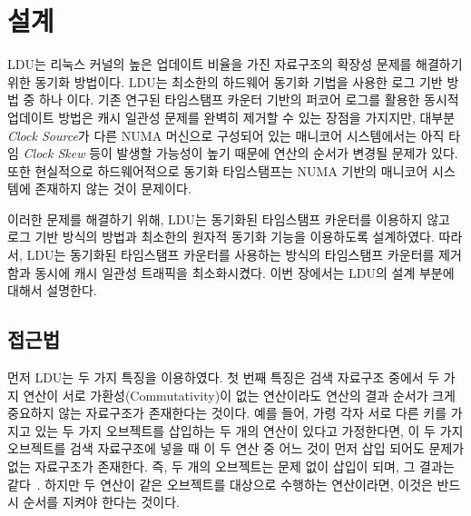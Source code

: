 \section{설계}
\label{sec:ldu}

LDU는 리눅스 커널의 높은 업데이트 비율을 가진 자료구조의 확장성 문제를 해결하기 위한 동기화 방법이다.
LDU는 최소한의 하드웨어 동기화 기법을 사용한 로그 기반 방법 중 하나 이다.
기존 연구된 타임스탬프 카운터 기반의 퍼코어 로그를 활용한 동시적 업데이트 방법은 
캐시 일관성 문제를 완벽히 제거할 수 있는 장점을 가지지만, 
대부분 \textit{Clock Source}가 다른 NUMA 머신으로 구성되어 있는 매니코어 시스템에서는 
아직 타임 \textit{Clock Skew} 등이 발생할 가능성이 높기 때문에 연산의 순서가 변경될 문제가 있다.
또한 현실적으로 하드웨어적으로 동기화 타임스탬프는 NUMA 기반의 매니코어 시스템에 존재하지 않는 것이 문제이다.

이러한 문제를 해결하기 위해, LDU는 동기화된 타임스탬프 카운터를 이용하지 않고 로그 기반 방식의 
방법과 최소한의 원자적 동기화 기능을 이용하도록 설계하였다.
따라서, LDU는 동기화된 타임스탬프 카운터를 사용하는 방식의 타임스탬프 카운터를 
제거함과 동시에 캐시 일관성 트래픽을 최소화시켰다.
이번 장에서는 LDU의 설계 부분에 대해서 설명한다. 

\subsection{접근법}
먼저 LDU는 두 가지 특징을 이용하였다. 
첫 번째 특징은 검색 자료구조 중에서 두 가지 연산이 서로 가환성(Commutativity)이 없는 연산이라도 
연산의 결과 순서가 크게 중요하지 않는 자료구조가 존재한다는 것이다. 
예를 들어, 가령 각자 서로 다른 키를 가지고 있는 두 가지 오브젝트를 삽입하는 두 개의 
연산이 있다고 가정한다면, 이 두 가지 오브젝트를 검색 자료구조에 넣을 때 이 두 연산 중 
어느 것이 먼저 삽입 되어도 문제가 없는 자료구조가 존재한다.  
즉, 두 개의 오브젝트는 문제 없이 삽입이 되며, 그 결과는 같다~\cite{PaulCreatingAPILWN}. 
하지만 두 연산이 같은 오브젝트를 대상으로 수행하는 연산이라면, 이것은 반드시 
순서를 지켜야 한다는 것이다.  

